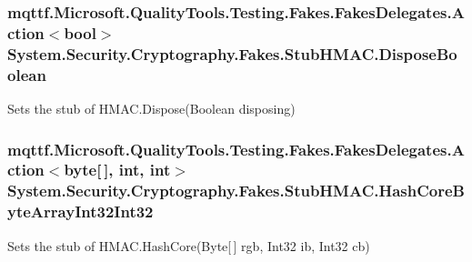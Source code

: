 \hypertarget{class_system_1_1_security_1_1_cryptography_1_1_fakes_1_1_stub_h_m_a_c_a2e45f976386084b657f5254b7595861c}{
\subsubsection[{Dispose\-Boolean}]{\setlength{\rightskip}{0pt plus 5cm}mqttf.\-Microsoft.\-Quality\-Tools.\-Testing.\-Fakes.\-Fakes\-Delegates.\-Action$<$bool$>$ System.\-Security.\-Cryptography.\-Fakes.\-Stub\-H\-M\-A\-C.\-Dispose\-Boolean}}\label{class_system_1_1_security_1_1_cryptography_1_1_fakes_1_1_stub_h_m_a_c_a2e45f976386084b657f5254b7595861c}


Sets the stub of H\-M\-A\-C.\-Dispose(\-Boolean disposing)

\hypertarget{class_system_1_1_security_1_1_cryptography_1_1_fakes_1_1_stub_h_m_a_c_a008383984a396e5bbabab54e219720a9}{
\subsubsection[{Hash\-Core\-Byte\-Array\-Int32\-Int32}]{\setlength{\rightskip}{0pt plus 5cm}mqttf.\-Microsoft.\-Quality\-Tools.\-Testing.\-Fakes.\-Fakes\-Delegates.\-Action$<$byte\mbox{[}$\,$\mbox{]}, int, int$>$ System.\-Security.\-Cryptography.\-Fakes.\-Stub\-H\-M\-A\-C.\-Hash\-Core\-Byte\-Array\-Int32\-Int32}}\label{class_system_1_1_security_1_1_cryptography_1_1_fakes_1_1_stub_h_m_a_c_a008383984a396e5bbabab54e219720a9}


Sets the stub of H\-M\-A\-C.\-Hash\-Core(\-Byte\mbox{[}$\,$\mbox{]} rgb, Int32 ib, Int32 cb)

